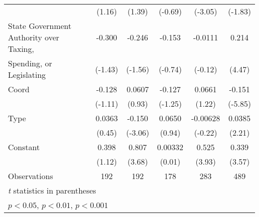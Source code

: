 {\begin{tabular}{l*{5}{c}}
                                        &    (1.16)         &    (1.39)         &   (-0.69)         &   (-3.05)         &   (-1.83)         \\
\addlinespace
State Government Authority over Taxing, &    -0.300         &    -0.246         &    -0.153         &   -0.0111         &     0.214\sym{***}\\
Spending, or Legislating                &   (-1.43)         &   (-1.56)         &   (-0.74)         &   (-0.12)         &    (4.47)         \\
\addlinespace
Coord                                   &    -0.128         &    0.0607         &    -0.127         &    0.0661         &    -0.151\sym{***}\\
                                        &   (-1.11)         &    (0.93)         &   (-1.25)         &    (1.22)         &   (-5.85)         \\
\addlinespace
Type                                    &    0.0363         &    -0.150\sym{**} &    0.0650         &  -0.00628         &    0.0385\sym{*}  \\
                                        &    (0.45)         &   (-3.06)         &    (0.94)         &   (-0.22)         &    (2.21)         \\
\addlinespace
Constant                                &     0.398         &     0.807\sym{***}&   0.00332         &     0.525\sym{***}&     0.339\sym{***}\\
                                        &    (1.12)         &    (3.68)         &    (0.01)         &    (3.93)         &    (3.57)         \\
\midrule
Observations                            &       192         &       192         &       178         &       283         &       489         \\
\bottomrule
\multicolumn{6}{l}{\footnotesize \textit{t} statistics in parentheses}\\
\multicolumn{6}{l}{\footnotesize \sym{*} \(p<0.05\), \sym{**} \(p<0.01\), \sym{***} \(p<0.001\)}\\
\end{tabular}
}
